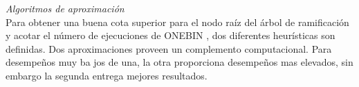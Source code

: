 \emph{Algoritmos de aproximación}\\

Para obtener una buena cota superior para el nodo raíz del árbol de ramificación y acotar el número de ejecuciones de ONEBIN
, dos diferentes heurísticas son definidas. Dos aproximaciones proveen un complemento computacional. Para desempeños muy ba
jos de una, la otra proporciona desempeños mas elevados, sin embargo la segunda entrega mejores resultados.\\

